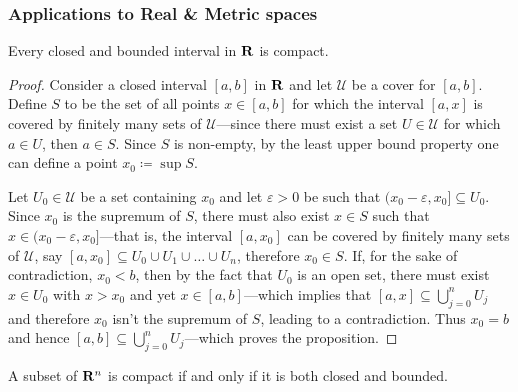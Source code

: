 \subsubsection{Applications to Real \& Metric spaces}

\begin{lemma}
\label{lem:closed-interval-is-compact}
Every closed and bounded interval in \(\mathbf{R}\) is compact.
\end{lemma}

\begin{proof}
Consider a closed interval \([a, b]\) in \(\mathbf{R}\) and let \(\mathcal{U}\) be a
cover for \([a, b]\). Define \(S\) to be the set of all points \(x \in [a, b]\)
for which the interval \([a, x]\) is covered by finitely many sets of
\(\mathcal{U}\)---since there must exist a set \(U \in \mathcal{U}\) for
which \(a \in U\), then \(a \in S\). Since \(S\) is non-empty, by the
least upper bound property one can define a point \(x_0 \coloneq \sup S\).

Let \(U_0 \in \mathcal{U}\) be a set containing \(x_0\) and let
\(\varepsilon > 0\) be such that \((x_0 - \varepsilon, x_0] \subseteq
U_0\). Since \(x_0\) is the supremum of \(S\), there must also exist \(x \in S\)
such that \(x \in (x_0 - \varepsilon, x_0]\)---that is, the interval
\([a, x_0]\) can be covered by finitely many sets of \(\mathcal{U}\), say
\([a, x_0] \subseteq U_0 \cup U_1 \cup \dots \cup U_n\), therefore
\(x_0 \in S\). If, for the sake of contradiction, \(x_0 < b\), then by the fact
that \(U_0\) is an open set, there must exist \(x \in U_0\) with \(x > x_0\) and
yet \(x \in [a, b]\)---which implies that
\([a, x] \subseteq \bigcup_{j=0}^n U_j\) and therefore \(x_0\)
isn't the supremum of \(S\), leading to a contradiction. Thus \(x_0 = b\) and
hence \([a, b] \subseteq \bigcup_{j=0}^n U_j\)---which proves the
proposition.
\end{proof}

\begin{corollary}
\label{cor:heine-borel}
A subset of \(\mathbf{R}^n\) is compact if and only if it is both closed and bounded.
\end{corollary}

